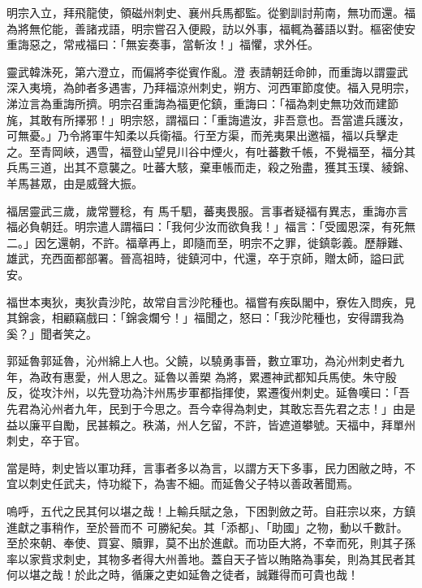 \begin{pinyinscope}
 明宗入立，拜飛龍使，領磁州刺史、襄州兵馬都監。從劉訓討荊南，無功而還。福為將無佗能，善諸戎語，明宗嘗召入便殿，訪以外事，福輒為蕃語以對。樞密使安重誨惡之，常戒福曰：「無妄奏事，當斬汝！」福懼，求外任。



 靈武韓洙死，第六澄立，而偏將李從賓作亂。澄
 表請朝廷命帥，而重誨以謂靈武深入夷境，為帥者多遇害，乃拜福涼州刺史，朔方、河西軍節度使。福入見明宗，涕泣言為重誨所擠。明宗召重誨為福更佗鎮，重誨曰：「福為刺史無功效而建節旄，其敢有所擇邪！」明宗怒，謂福曰：「重誨遣汝，非吾意也。吾當遣兵護汝，可無憂。」乃令將軍牛知柔以兵衛福。行至方渠，而羌夷果出邀福，福以兵擊走之。至青岡峽，遇雪，福登山望見川谷中煙火，有吐蕃數千帳，不覺福至，福分其兵馬三道，出其不意襲之。吐蕃大駭，棄車帳而走，殺之殆盡，獲其玉璞、綾錦、羊馬甚眾，由是威聲大振。



 福居靈武三歲，歲常豐稔，有
 馬千駟，蕃夷畏服。言事者疑福有異志，重誨亦言福必負朝廷。明宗遣人謂福曰：「我何少汝而欲負我！」福言：「受國恩深，有死無二。」因乞還朝，不許。福章再上，即隨而至，明宗不之罪，徙鎮彰義。歷靜難、雄武，充西面都部署。晉高祖時，徙鎮河中，代還，卒于京師，贈太師，謚曰武安。



 福世本夷狄，夷狄貴沙陀，故常自言沙陀種也。福嘗有疾臥閣中，寮佐入問疾，見其錦衾，相顧竊戲曰：「錦衾爛兮！」福聞之，怒曰：「我沙陀種也，安得謂我為奚？」聞者笑之。



 郭延魯郭延魯，沁州綿上人也。父饒，以驍勇事晉，數立軍功，為沁州刺史者九年，為政有惠愛，州人思之。延魯以善槊
 為將，累遷神武都知兵馬使。朱守殷反，從攻汴州，以先登功為汴州馬步軍都指揮使，累遷復州刺史。延魯嘆曰：「吾先君為沁州者九年，民到于今思之。吾今幸得為刺史，其敢忘吾先君之志！」由是益以廉平自勵，民甚賴之。秩滿，州人乞留，不許，皆遮道攀號。天福中，拜單州刺史，卒于官。



 當是時，刺史皆以軍功拜，言事者多以為言，以謂方天下多事，民力困敝之時，不宜以刺史任武夫，恃功縱下，為害不細。而延魯父子特以善政著聞焉。



 嗚呼，五代之民其何以堪之哉！上輸兵賦之急，下困剝斂之苛。自莊宗以來，方鎮進獻之事稍作，至於晉而不
 可勝紀矣。其「添都」、「助國」之物，動以千數計。至於來朝、奉使、買宴、贖罪，莫不出於進獻。而功臣大將，不幸而死，則其子孫率以家貲求刺史，其物多者得大州善地。蓋自天子皆以賄賂為事矣，則為其民者其何以堪之哉！於此之時，循廉之吏如延魯之徒者，誠難得而可貴也哉！



\end{pinyinscope}
